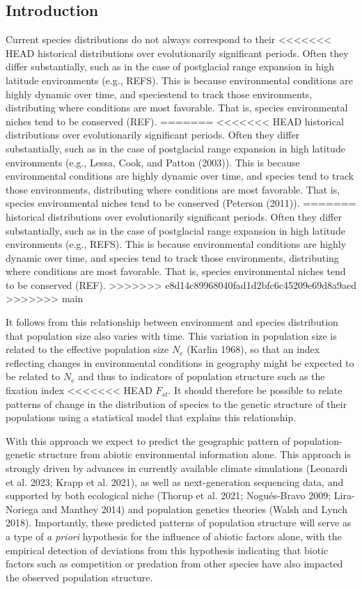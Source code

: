 \documentclass[
]{article}
\begin{document}
\hypertarget{introduction}{%
\subsection{Introduction}\label{introduction}}

Current species distributions do not always correspond to their
<<<<<<< HEAD
historical distributions over evolutionarily significant periods. Often they differ substantially, such as in the case of postglacial range expansion in high latitude environments (e.g., REFS). This is because environmental conditions are highly dynamic over time, and speciestend  to track those environments, distributing where conditions are most favorable. That is, species environmental niches tend to be conserved (REF).
=======
<<<<<<< HEAD
historical distributions over evolutionarily significant periods. Often
they differ substantially, such as in the case of postglacial range
expansion in high latitude environments (e.g., Lessa, Cook, and Patton
(2003)). This is because environmental conditions are highly dynamic
over time, and species tend to track those environments, distributing
where conditions are most favorable. That is, species environmental
niches tend to be conserved (Peterson (2011)).
=======
historical distributions over evolutionarily significant periods. Often they differ substantially, such as in the case of postglacial range expansion in high latitude environments (e.g., REFS). This
is because environmental conditions are highly dynamic over time, and species
tend to track those environments, distributing where conditions are most favorable. That is, species environmental niches tend to be conserved (REF).
>>>>>>> e8d14c89968040fad1d2bfc6c45209e69d8a9aed
>>>>>>> main

It follows from this relationship between environment and species
distribution that population size also varies with time. This variation
in population size is related to the effective population size \(N_e\)
(Karlin 1968), so that an index reflecting changes in environmental
conditions in geography might be expected to be related to \(N_e\) and
thus to indicators of population structure such as the fixation index
<<<<<<< HEAD
\(F_{st}\). It should therefore be possible to relate patterns of change
in the distribution of species to the genetic structure of their
populations using a statistical model that explains this relationship.

With this approach we expect to predict the geographic pattern of
population-genetic structure from abiotic environmental information
alone. This approach is strongly driven by advances in currently
available climate simulations (Leonardi et al. 2023; Krapp et al. 2021),
as well as next-generation sequencing data, and supported by both
ecological niche (Thorup et al. 2021; Nogués-Bravo 2009; Lira-Noriega
and Manthey 2014) and population genetics theories (Walsh and Lynch
2018). Importantly, these predicted patterns of population structure
will serve as a type of \textit{a priori} hypothesis for the influence
of abiotic factors alone, with the empirical detection of deviations
from this hypothesis indicating that biotic factors such as competition
or predation from other species have also impacted the observed
population structure.
\end{document}
